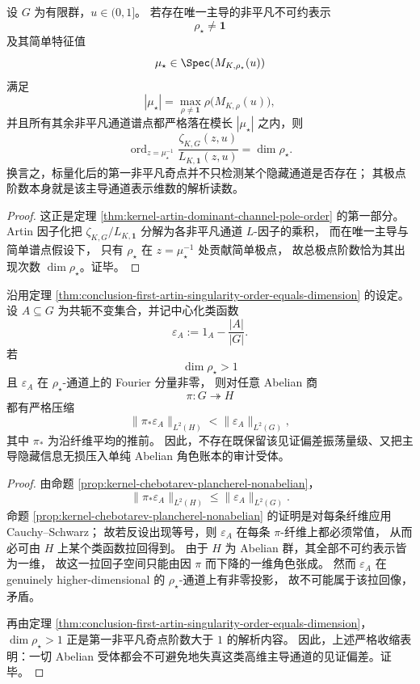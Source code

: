 \begin{theorem}\label{thm:conclusion-first-artin-singularity-order-equals-dimension}
设 \(G\) 为有限群，\(u\in(0,1]\)。
若存在唯一主导的非平凡不可约表示
\[
\rho_\star\neq \mathbf{1}
\]
及其简单特征值
\[
\mu_\star\in \Spec(M_{K,\rho_\star}(u))
\]
满足
\[
|\mu_\star|
=
\max_{\rho\neq \mathbf{1}}\rho\!\bigl(M_{K,\rho}(u)\bigr),
\]
并且所有其余非平凡通道谱点都严格落在模长 \(|\mu_\star|\) 之内，则
\[
\operatorname{ord}_{z=\mu_\star^{-1}}
\frac{\zeta_{K,G}(z,u)}{L_{K,\mathbf 1}(z,u)}
=
\dim \rho_\star.
\]
换言之，标量化后的第一非平凡奇点并不只检测某个隐藏通道是否存在；
其极点阶数本身就是该主导通道表示维数的解析读数。
\end{theorem}
\begin{proof}
这正是定理 \ref{thm:kernel-artin-dominant-channel-pole-order} 的第一部分。
Artin 因子化把
\(
\zeta_{K,G}/L_{K,\mathbf 1}
\)
分解为各非平凡通道 \(L\)-因子的乘积，
而在唯一主导与简单谱点假设下，
只有 \(\rho_\star\) 在 \(z=\mu_\star^{-1}\) 处贡献简单极点，
故总极点阶数恰为其出现次数 \(\dim\rho_\star\)。证毕。
\end{proof}

\begin{theorem}\label{thm:conclusion-higher-dimensional-artin-channel-forces-abelian-distortion}
沿用定理 \ref{thm:conclusion-first-artin-singularity-order-equals-dimension} 的设定。
设 \(A\subseteq G\) 为共轭不变集合，并记中心化类函数
\[
\varepsilon_A:=1_A-\frac{|A|}{|G|}.
\]
若
\[
\dim\rho_\star>1
\]
且 \(\varepsilon_A\) 在 \(\rho_\star\)-通道上的 Fourier 分量非零，
则对任意 Abelian 商
\[
\pi:G\twoheadrightarrow H
\]
都有严格压缩
\[
\bigl\|\pi_\ast\varepsilon_A\bigr\|_{L^2(H)}
<
\bigl\|\varepsilon_A\bigr\|_{L^2(G)},
\]
其中 \(\pi_\ast\) 为沿纤维平均的推前。
因此，不存在既保留该见证偏差振荡量级、又把主导隐藏信息无损压入单纯 Abelian 角色账本的审计受体。
\end{theorem}
\begin{proof}
由命题 \ref{prop:kernel-chebotarev-plancherel-nonabelian}，
\[
\bigl\|\pi_\ast\varepsilon_A\bigr\|_{L^2(H)}
\le
\bigl\|\varepsilon_A\bigr\|_{L^2(G)}.
\]
命题 \ref{prop:kernel-chebotarev-plancherel-nonabelian} 的证明是对每条纤维应用 Cauchy--Schwarz；
故若反设出现等号，则 \(\varepsilon_A\) 在每条 \(\pi\)-纤维上都必须常值，
从而必可由 \(H\) 上某个类函数拉回得到。
由于 \(H\) 为 Abelian 群，其全部不可约表示皆为一维，
故这一拉回子空间只能由因 \(\pi\) 而下降的一维角色张成。
然而 \(\varepsilon_A\) 在 genuinely higher-dimensional 的 \(\rho_\star\)-通道上有非零投影，
故不可能属于该拉回像，矛盾。

再由定理 \ref{thm:conclusion-first-artin-singularity-order-equals-dimension}，
\(\dim\rho_\star>1\) 正是第一非平凡奇点阶数大于 \(1\) 的解析内容。
因此，上述严格收缩表明：一切 Abelian 受体都会不可避免地失真这类高维主导通道的见证偏差。证毕。
\end{proof}

